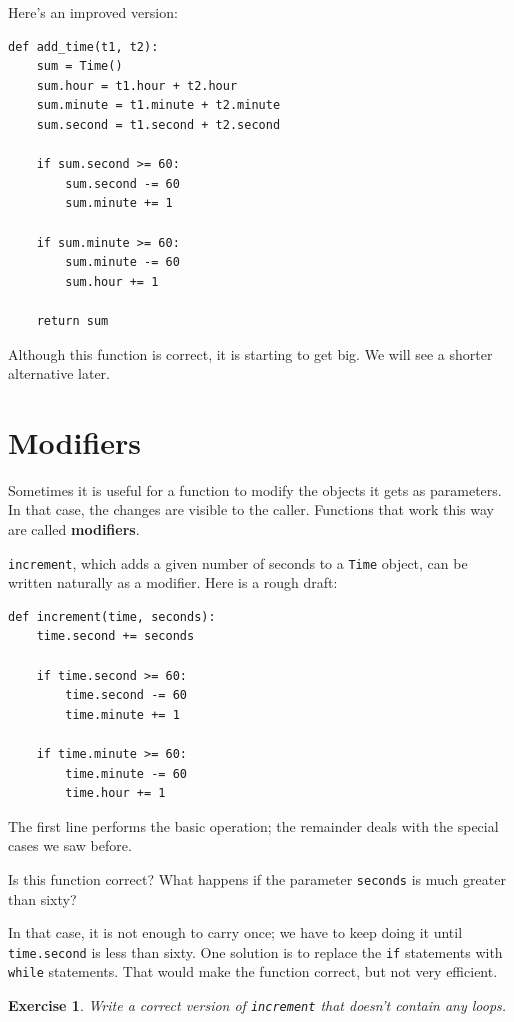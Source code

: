 \documentclass[12pt,a4paper,final,twoside,onecolumn,titlepage]{book}
\newtheorem{exercise}{Exercise}[chapter]
\begin{document}
Here's an improved version:

\begin{verbatim}
def add_time(t1, t2):
    sum = Time()
    sum.hour = t1.hour + t2.hour
    sum.minute = t1.minute + t2.minute
    sum.second = t1.second + t2.second

    if sum.second >= 60:
        sum.second -= 60
        sum.minute += 1

    if sum.minute >= 60:
        sum.minute -= 60
        sum.hour += 1

    return sum
\end{verbatim}
%
Although this function is correct, it is starting to get big.
We will see a shorter alternative later.


\section{Modifiers}
\label{increment}

Sometimes it is useful for a function to modify the objects it gets as
parameters.  In that case, the changes are visible to the caller.
Functions that work this way are called {\bf modifiers}.

{\tt increment}, which adds a given number of seconds to a {\tt Time}
object, can be written naturally as a
modifier.  Here is a rough draft:

\begin{verbatim}
def increment(time, seconds):
    time.second += seconds

    if time.second >= 60:
        time.second -= 60
        time.minute += 1

    if time.minute >= 60:
        time.minute -= 60
        time.hour += 1
\end{verbatim}
%
The first line performs the basic operation; the remainder deals
with the special cases we saw before.

Is this function correct?  What happens if the parameter {\tt seconds}
is much greater than sixty?  

In that case, it is not enough to carry
once; we have to keep doing it until {\tt time.second} is less than sixty.
One solution is to replace the {\tt if} statements with {\tt while}
statements.  That would make the function correct, but not
very efficient.

\begin{exercise}

Write a correct version of {\tt increment} that
doesn't contain any loops.

\end{exercise}
\end{document}
